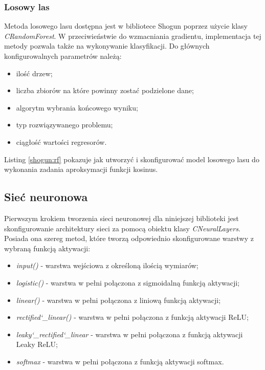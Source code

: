 \subsubsection{Losowy las}
Metoda losowego lasu dostępna jest w bibliotece Shogun poprzez użycie klasy \textit{CRandomForest}. W przeciwieństwie do wzmacniania gradientu, implementacja tej metody pozwala także na wykonywanie klasyfikacji. Do głównych konfigurowalnych parametrów należą:

\begin{itemize}
	\item ilość drzew;
	\item liczba zbiorów na które powinny zostać podzielone dane;
	\item algorytm wybrania końcowego wyniku;
	\item typ rozwiązywanego problemu;
	\item ciągłość wartości regresorów.
\end{itemize}

Listing \ref{shogun:rf} pokazuje jak utworzyć i skonfigurować model losowego lasu do wykonania zadania aproksymacji funkcji kosinus.


\subsection{Sieć neuronowa}

Pierwszym krokiem tworzenia sieci neuronowej dla niniejszej biblioteki jest skonfigurowanie architektury sieci za pomocą obiektu klasy \textit{CNeuralLayers}. Posiada ona szereg metod, które tworzą odpowiednio skonfigurowane warstwy z wybraną funkcją aktywacji:

\begin{itemize}
	\item \textit{input()} - warstwa wejściowa z określoną ilością wymiarów;
	\item \textit{logistic()} - warstwa w pełni połączona z sigmoidalną funkcją aktywacji;
	\item \textit{linear()} - warstwa w pełni połączona z liniową funkcją aktywacji;
	\item \textit{rectified\char`_linear()} - warstwa w pełni połączona z funkcją aktywacji ReLU;
	\item \textit{leaky\char`_rectified\char`_linear} - warstwa w pełni połączona z funkcją aktywacji Leaky ReLU;
	\item \textit{softmax} - warstwa w pełni połączona z funkcją aktywacji softmax. 
\end{itemize}


